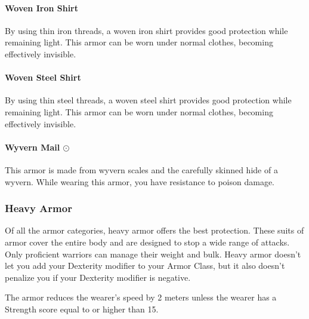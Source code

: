     \paragraph{Woven Iron Shirt}
        By using thin iron threads, a woven iron shirt provides good protection while remaining light.
        This armor can be worn under normal clothes, becoming effectively invisible.
    \paragraph{Woven Steel Shirt}
        By using thin steel threads, a woven steel shirt provides good protection while remaining light.
        This armor can be worn under normal clothes, becoming effectively invisible.
    \paragraph{Wyvern Mail $\odot$}
        This armor is made from wyvern scales and the carefully skinned hide of a wyvern.
        While wearing this armor, you have resistance to poison damage.
\newpage
\subsubsection{Heavy Armor} \label{ssec::heavyarmor}
    Of all the armor categories, heavy armor offers the best protection.
    These suits of armor cover the entire body and are designed to stop a wide range of attacks.
    Only proficient warriors can manage their weight and bulk.
    Heavy armor doesn't let you add your Dexterity modifier to your Armor Class, but it also doesn't penalize you if your Dexterity modifier is negative.

    The armor reduces the wearer's speed by 2 meters unless the wearer has a Strength score equal to or higher than 15.

